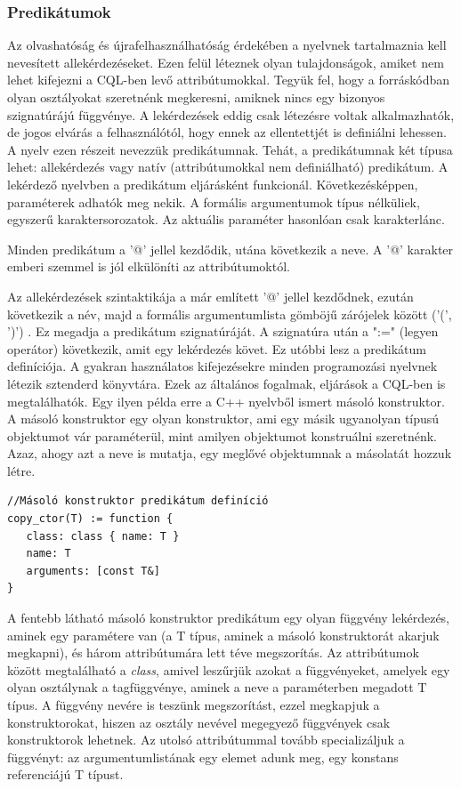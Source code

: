 \documentclass[a4paper,12pt]{report}
\begin{document}
\subsubsection{Predikátumok}
Az olvashatóság és újrafelhasználhatóság érdekében a nyelvnek tartalmaznia kell nevesített allekérdezéseket. Ezen felül léteznek olyan tulajdonságok, amiket nem lehet kifejezni a CQL-ben levő attribútumokkal. Tegyük fel, hogy a forráskódban olyan osztályokat szeretnénk megkeresni, amiknek nincs egy bizonyos szignatúrájú függvénye. A lekérdezések eddig csak létezésre voltak alkalmazhatók, de jogos elvárás a felhasználótól, hogy ennek az ellentettjét is definiálni lehessen. A nyelv ezen részeit nevezzük predikátumnak. Tehát, a predikátumnak két típusa lehet: allekérdezés vagy natív (attribútumokkal nem definiálható) predikátum. A lekérdező nyelvben a predikátum eljárásként funkcionál. Következésképpen, paraméterek adhatók meg nekik. A formális argumentumok típus nélküliek, egyszerű karaktersorozatok. Az aktuális paraméter hasonlóan csak karakterlánc.
\par Minden predikátum a '@' jellel kezdődik, utána következik a neve. A '@' karakter emberi szemmel is jól elkülöníti az attribútumoktól. 
\par Az allekérdezések szintaktikája a már említett '@' jellel kezdődnek, ezután következik a név, majd a formális argumentumlista gömböjű zárójelek között ('(', ')')
. Ez megadja a predikátum szignatúráját. A szignatúra után a ":=" (legyen operátor) következik, amit egy lekérdezés követ. Ez utóbbi lesz a predikátum definíciója. A gyakran használatos kifejezésekre minden programozási nyelvnek létezik sztenderd könyvtára. Ezek az általános fogalmak, eljárások a CQL-ben is megtalálhatók. Egy ilyen példa erre a C++ nyelvből ismert másoló konstruktor. A másoló konstruktor egy olyan konstruktor, ami egy másik ugyanolyan típusú objektumot vár paraméterül, mint amilyen objektumot konstruálni szeretnénk. Azaz, ahogy azt a neve is mutatja, egy meglővé objektumnak a másolatát hozzuk létre.
\begin{verbatim}
//Másoló konstruktor predikátum definíció
copy_ctor(T) := function {
   class: class { name: T }
   name: T
   arguments: [const T&]
}
\end{verbatim}
\par A fentebb látható másoló konstruktor predikátum egy olyan függvény lekérdezés, aminek egy paramétere van (a T típus, aminek a másoló konstruktorát akarjuk megkapni), és három attribútumára lett téve megszorítás. Az attribútumok között megtalálható a \textit{class}, amivel leszűrjük azokat a függvényeket, amelyek egy olyan osztálynak a tagfüggvénye, aminek a neve a paraméterben megadott T típus. A függvény nevére is teszünk megszorítást, ezzel megkapjuk a konstruktorokat, hiszen az osztály nevével megegyező függvények csak konstruktorok lehetnek. Az utolsó attribútummal tovább specializáljuk a függvényt: az argumentumlistának egy elemet adunk meg, egy konstans referenciájú T típust.
\end{document}
